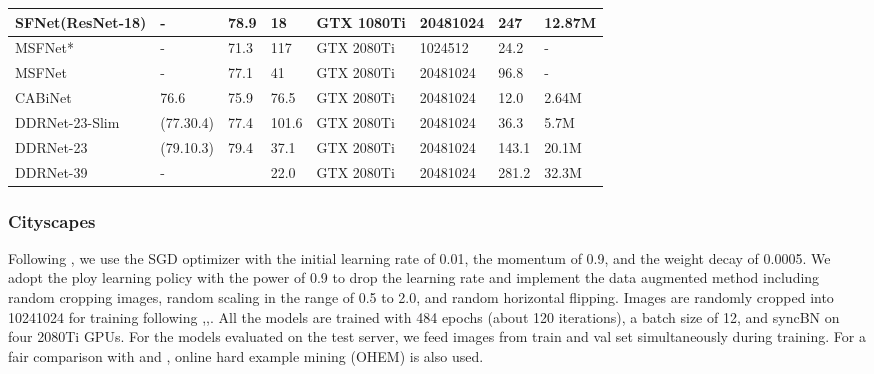 \documentclass[journal]{IEEEtran}
\begin{document}
\begin{table*}[]
\begin{tabular}{p{80pt}p{43pt}<{\centering}p{43pt}<{\centering}p{50pt}<{\centering}p{50pt}<{\centering}p{50pt}<{\centering}p{50pt}<{\centering}p{50pt}<{\centering}}
SFNet(ResNet-18)\cite{li2020semantic}& -      &78.9     & 18       & GTX 1080Ti           & 20481024             & 247                        & 12.87M                       \\ \midrule
MSFNet*\cite{si2019real}& -          & 71.3       & 117                  & GTX 2080Ti           & 1024512            & 24.2                        & -                       \\
MSFNet\cite{si2019real}& -           & 77.1       & 41                   & GTX 2080Ti           & 20481024            & 96.8                        & -                       \\ \midrule
CABiNet\cite{kumaar2020cabinet}& 76.6      &75.9     & 76.5       & GTX 2080Ti           & 20481024             & 12.0                        & 2.64M                       \\ \midrule
DDRNet-23-Slim& (77.30.4)    & 77.4     & 101.6         & GTX 2080Ti           & 20481024         & 36.3                        & 5.7M                   \\
DDRNet-23     & (79.10.3)    & 79.4  & 37.1  & GTX 2080Ti           & 20481024            & 143.1                        & 20.1M                   \\
DDRNet-39     & -             &   & 22.0  & GTX 2080Ti           & 20481024            & 281.2                        & 32.3M                   \\ \bottomrule
\end{tabular}
\end{table*}

\subsubsection{Cityscapes}

Following \cite{9052469}, we use the SGD optimizer with the initial learning rate of 0.01, the momentum of 0.9, and the weight decay of 0.0005. We adopt the ploy learning policy with the power of 0.9 to drop the learning rate and implement the data augmented method including random cropping images, random scaling in the range of 0.5 to 2.0, and random horizontal flipping. Images are randomly cropped into 10241024 for training following \cite{li2019dfanet},\cite{si2019real},\cite{li2020semantic}. All the models are trained with 484 epochs (about 120 iterations), a batch size of 12, and syncBN on four 2080Ti GPUs. For the models evaluated on the test server, we feed images from train and val set simultaneously during training. For a fair comparison with \cite{yu2020bisenet} and \cite{li2020semantic}, online hard example mining (OHEM)\cite{shrivastava2016training} is also used.
\end{document}
